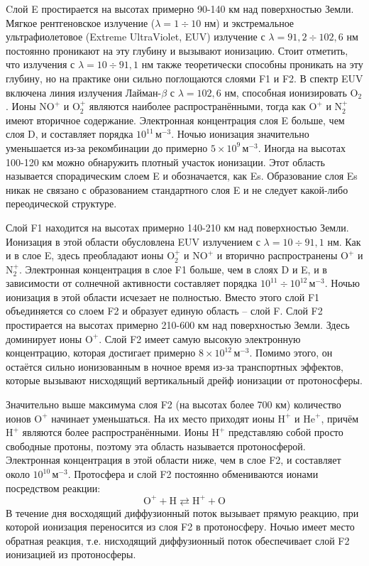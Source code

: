 Cлой E простирается на высотах примерно 90-140 км над поверхностью Земли.
Мягкое рентгеновское излучение ($\lambda=1\div10$ нм) и экстремальное ультрафиолетовое (Extreme UltraViolet, EUV) излучение с $\lambda=91,2\div102,6$ нм постоянно проникают на эту глубину и вызывают ионизацию.
Стоит отметить, что излучения с $\lambda=10\div91,1$ нм также теоретически способны проникать на эту глубину, но на практике они сильно поглощаются слоями F1 и F2. 
В спектр EUV включена линия излучения Лайман-$\beta$ с $\lambda=102,6$ нм, способная ионизировать $\text{O}_2$.
Ионы $\text{NO}^{+}$ и $\text{O}_2^{+}$ являются наиболее распространёнными, тогда как $\text{O}^{+}$ и $\text{N}_2^{+}$ имеют вторичное содержание.
Электронная концентрация слоя E больше, чем слоя D, и составляет порядка $10^{11}\,\text{м}^{-3}$.
Ночью ионизация значительно уменьшается из-за рекомбинации до примерно $5\times10^{9}\,\text{м}^{-3}$.
Иногда на высотах 100-120 км можно обнаружить плотный участок ионизации.
Этот область называется спорадическим слоем E и обозначается, как Es.
Образование слоя Es никак не связано с образованием стандартного слоя E и не следует какой-либо переодической структуре.

Слой F1 находится на высотах примерно 140-210 км над поверхностью Земли.
Ионизация в этой области обусловлена EUV излучением с $\lambda=10\div91,1$ нм.
Как и в слое E, здесь преобладают ионы $\text{O}_2^{+}$ и $\text{NO}^{+}$ и вторично распространены $\text{O}^{+}$ и $\text{N}_2^{+}$.
Электронная концентрация в слое F1 больше, чем в слоях D и E, и в зависимости от солнечной активности составляет порядка $10^{11}\div10^{12}\,\text{м}^{-3}$.  
Ночью ионизация в этой области исчезает не полностью.
Вместо этого слой F1 объединяется со слоем F2 и образует единую область -- слой F.
Слой F2 простирается на высотах примерно 210-600 км над поверхностью Земли.
Здесь доминирует ионы $\text{O}^{+}$.
Слой F2 имеет самую высокую электронную концентрацию, которая достигает примерно $8\times10^{12}\,\text{м}^{-3}$.
Помимо этого, он остаётся сильно ионизованным в ночное время из-за транспортных эффектов, которые вызывают нисходящий вертикальный дрейф ионизации от протоносферы.

Значительно выше максимума слоя F2 (на высотах более 700 км) количество ионов $\text{O}^{+}$ начинает уменьшаться.
На их место приходят ионы $\text{H}^{+}$ и $\text{He}^{+}$, причём $\text{H}^{+}$ являются более распространёнными.
Ионы $\text{H}^{+}$ представляю собой просто свободные протоны, поэтому эта область называется протоносферой.
Электронная концентрация в этой области ниже, чем в слое F2, и составляет около  $10^{10}\,\text{м}^{-3}$.
Протосфера и слой F2 постоянно обмениваются ионами посредством реакции:
\begin{equation}
\text{O}^{+}+\text{H}\rightleftarrows\text{H}^{+}+\text{O}
\end{equation}
В течение дня восходящий диффузионный поток вызывает прямую реакцию, при которой ионизация переносится из слоя F2 в протоносферу.
Ночью имеет место обратная реакция, т.е. нисходящий диффузионный поток обеспечивает слой F2 ионизацией из протоносферы.

